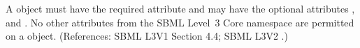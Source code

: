 A \UnitDefinition object must have the required attribute  and
may have the optional attributes ,  and
.  No other attributes from the SBML Level~3 Core namespace are
permitted on a \UnitDefinition object.  (References: SBML L3V1 Section 4.4; SBML L3V2
.)
